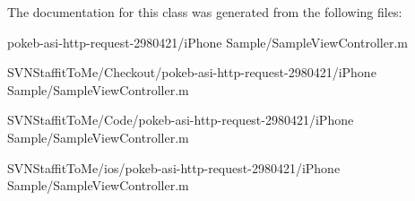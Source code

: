 \-The documentation for this class was generated from the following files\-:\begin{DoxyCompactItemize}
\item 
pokeb-\/asi-\/http-\/request-\/2980421/i\-Phone Sample/\-Sample\-View\-Controller.\-m\item 
\-S\-V\-N\-Staffit\-To\-Me/\-Checkout/pokeb-\/asi-\/http-\/request-\/2980421/i\-Phone Sample/\-Sample\-View\-Controller.\-m\item 
\-S\-V\-N\-Staffit\-To\-Me/\-Code/pokeb-\/asi-\/http-\/request-\/2980421/i\-Phone Sample/\-Sample\-View\-Controller.\-m\item 
\-S\-V\-N\-Staffit\-To\-Me/ios/pokeb-\/asi-\/http-\/request-\/2980421/i\-Phone Sample/\-Sample\-View\-Controller.\-m\end{DoxyCompactItemize}
